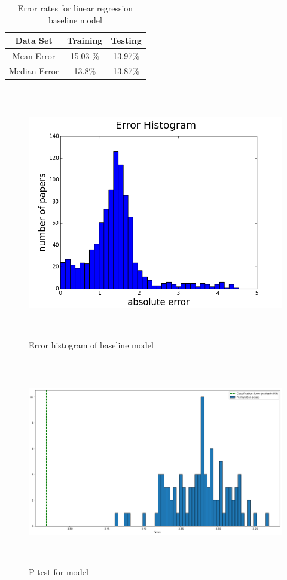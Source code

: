 \documentclass[a4paper, 11pt]{article}
\begin{document}
\begin{table}[h!]
\centering
\begin{tabular}{||c c c ||} 
 \hline
 Data Set & Training &  Testing \\ [0.5ex] 
 \hline\hline
 Mean Error &  15.03 \%& 13.97\% \\ [1ex] 
Median Error & 13.8\%  & 13.87\% \\ [1ex] 
 \hline
\end{tabular}
\caption{Error rates for linear regression baseline model}
\label{table:1}
\end{table}
\begin{figure}[h]
    \centering
    \includegraphics[width=17cm,height=11cm]{figure_1}
    \caption{Error histogram of baseline model}
    \label{fig:errorhistogram}
\end{figure}
\begin{figure}[h]
    \centering
    \includegraphics[width=16cm,height=9cm]{permutation_test}
    \caption{P-test for model}
    \label{fig:ptest}
\end{figure}
\end{document}
